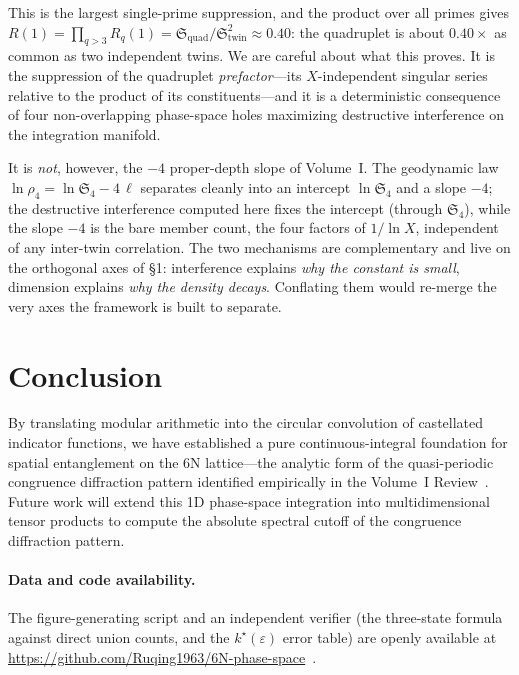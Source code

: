 \documentclass[11pt,a4paper]{article}
\begin{document}
This is the largest single-prime suppression, and the product over all primes gives
$R(1)=\prod_{q>3}R_q(1)=\mathfrak{S}_{\text{quad}}/\mathfrak{S}_{\text{twin}}^2\approx0.40$:
the quadruplet is about $0.40\times$ as common as two independent twins. We are
careful about what this proves. It is the suppression of the quadruplet
\emph{prefactor}---its $X$-independent singular series relative to the product of
its constituents---and it is a deterministic consequence of four non-overlapping
phase-space holes maximizing destructive interference on the integration manifold.

It is \emph{not}, however, the $-4$ proper-depth slope of Volume~I. The geodynamic
law $\ln\rho_4=\ln\mathfrak{S}_4-4\,\ell$ separates cleanly into an intercept
$\ln\mathfrak{S}_4$ and a slope $-4$; the destructive interference computed here
fixes the intercept (through $\mathfrak{S}_4$), while the slope $-4$ is the bare
member count, the four factors of $1/\ln X$, independent of any inter-twin
correlation. The two mechanisms are complementary and live on the orthogonal axes
of \S1: interference explains \emph{why the constant is small}, dimension explains
\emph{why the density decays}. Conflating them would re-merge the very axes the
framework is built to separate.

\section{Conclusion}
By translating modular arithmetic into the circular convolution of castellated indicator functions, we have established a pure continuous-integral foundation for spatial entanglement on the 6N lattice---the analytic form of the quasi-periodic congruence diffraction pattern identified empirically in the Volume~I Review~\cite{Review}. Future work will extend this 1D phase-space integration into multidimensional tensor products to compute the absolute spectral cutoff of the congruence diffraction pattern.

\paragraph{Data and code availability.}
The figure-generating script and an independent verifier (the three-state formula
against direct union counts, and the $k^\star(\varepsilon)$ error table) are openly
available at \url{https://github.com/Ruqing1963/6N-phase-space}~\cite{repo}.
\end{document}
